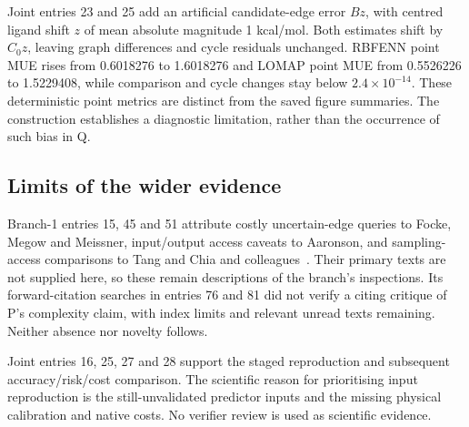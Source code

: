 \documentclass{article}
\begin{document}
Joint entries 23 and 25 add an artificial candidate-edge error \(Bz\), with centred ligand shift \(z\) of mean absolute magnitude 1 kcal/mol. Both estimates shift by \(C_0z\), leaving graph differences and cycle residuals unchanged. RBFENN point MUE rises from 0.6018276 to 1.6018276 and LOMAP point MUE from 0.5526226 to 1.5229408, while comparison and cycle changes stay below \(2.4\times10^{-14}\). These deterministic point metrics are distinct from the saved figure summaries. The construction establishes a diagnostic limitation, rather than the occurrence of such bias in Q.

\subsection{Limits of the wider evidence}

Branch-1 entries 15, 45 and 51 attribute costly uncertain-edge queries to Focke, Megow and Meissner, input/output access caveats to Aaronson, and sampling-access comparisons to Tang and Chia and colleagues~\cite{queries,fineprint,Tang,Chia}. Their primary texts are not supplied here, so these remain descriptions of the branch's inspections. Its forward-citation searches in entries 76 and 81 did not verify a citing critique of P's complexity claim, with index limits and relevant unread texts remaining. Neither absence nor novelty follows.

Joint entries 16, 25, 27 and 28 support the staged reproduction and subsequent accuracy/risk/cost comparison. The scientific reason for prioritising input reproduction is the still-unvalidated predictor inputs and the missing physical calibration and native costs. No verifier review is used as scientific evidence.



\end{document}
